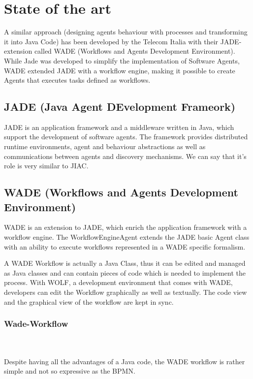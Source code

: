 \chapter{State of the art}

A similar approach (designing agents behaviour with processes and transforming it into Java Code) has been developed by the Telecom Italia with their JADE-extension called WADE (Workflows and Agents Development Environment). While Jade was developed to simplify the implementation of Software Agents, WADE extended JADE with a workflow engine, making it possible to create Agents that executes tasks defined as workflows.

\section{JADE (\textbf{J}ava \textbf{A}gent \textbf{DE}velopment Frameork)}
JADE is an application framework and a middleware written in Java, which support the development of software agents. The framework  provides distributed runtime environments, agent and behaviour abstractions as well as communications between agents and discovery mechanisms. We can say that it's role is very similar to JIAC.

\section{WADE (Workflows and Agents Development Environment)}
WADE is an extension to JADE, which enrich the application framework with a workflow engine. The WorkflowEngineAgent extends the JADE basic Agent class with an ability to execute workflows represented in a WADE specific formalism.

A WADE Workflow is actually a Java Class, thus it can be edited and managed as Java classes and can contain pieces of code which is needed to implement the process. With WOLF, a development environment that comes with WADE, developers can edit the Workflow graphically as well as textually. The code view and the graphical view of the workflow are kept in sync. 


\subsection{Wade-Workflow}
\\\\
Despite having all the advantages of a Java code, the WADE workflow is rather simple and not so expressive as the BPMN.
